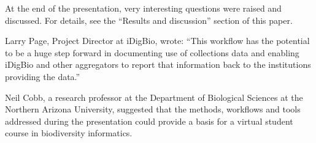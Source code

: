 At the end of the presentation, very interesting questions were raised and discussed. For details, see the ``Results and discussion'' section of this paper.

Larry Page, Project Director at iDigBio, wrote: ``This workflow has the potential to be a huge step forward in documenting use of collections data and enabling iDigBio and other aggregators to report that information back to the institutions providing the data.''

Neil Cobb, a research professor at the Department of Biological Sciences at the Northern Arizona University, suggested that the methods, workflows and tools addressed during the presentation could provide a basis for a virtual student course in biodiversity informatics.